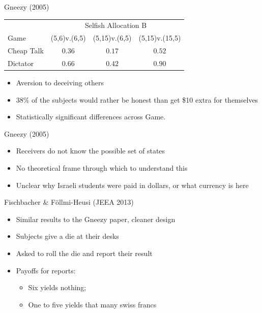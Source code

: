 \documentclass{beamer}
\begin{document}
\begin{frame}{Gneezy (2005)}
\begin{card}
	\begin{center}
		\begin{tabular}{lccc}\toprule
		& \multicolumn{3}{c}{Selfish Allocation B }\\ \cmidrule{2-4}
		Game & {\small (5,6)v.(6,5)} & {\small (5,15)v.(6,5)} & {\small (5,15)v.(15,5)} \\ \midrule
		Cheap Talk &   $0.36$  & $0.17$ & $0.52$  \\
		Dictator   &   $0.66$  & $0.42$ & $0.90$  \\ \bottomrule	  
		\end{tabular}
	\end{center}
\end{card}	

\begin{card}
    	\begin{itemize}
    		\item Aversion to deceiving others
    		\item 38\% of the subjects would rather be honest than get \$10 extra for themselves
    		\item Statistically significant differences across Game.
    	\end{itemize}
    \end{card}
\end{frame}

\begin{frame}{Gneezy (2005)}
\begin{card}
	\begin{itemize}
		\item Receivers do not know the possible set of states
		\item No theoretical frame through which to understand this
		\item Unclear why Israeli students were paid in dollars, or what currency is here
	\end{itemize}
\end{card}
\end{frame}

\begin{frame}{Fischbacher \& F\"ollmi-Heusi (JEEA 2013)}
\begin{card}
	\begin{itemize}
		\item Similar results to the Gneezy paper, cleaner design
		\item Subjects give a die at their desks
		\item Asked to roll the die and report their result
		\item Payoffs for reports: 
		\begin{itemize}
			\item Six yields nothing; 
			\item One to five yields that many swiss francs
		\end{itemize}
	\end{itemize}
\end{card}
\end{frame}
\end{document}
